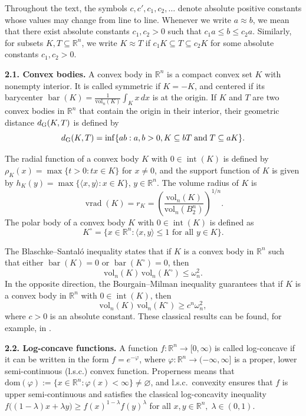\documentclass[11pt,leqno]{article}
\theoremstyle{definition}
\theoremstyle{remark}
\numberwithin{equation}{section}
\newcommand{\vol}{\mathrm{vol}}
\newcommand{\ls}{\leqslant}
\newcommand{\gr}{\geqslant}
\begin{document}
\smallskip

Throughout the text, the symbols $c, c', c_1, c_2, \ldots$ denote absolute positive constants whose values may change from line to line.  
Whenever we write $a \approx b$, we mean that there exist absolute constants $c_1, c_2 > 0$ such that $c_1 a \ls b \ls c_2 a$. 
Similarly, for subsets $K,T\subseteq \mathbb{R}^n$, we write $K\approx T$ if
$c_1K\subseteq T\subseteq c_2K$ for some absolute constants $c_1,c_2>0$.

\bigskip 

\textbf{2.1. Convex bodies.} A convex body in $\mathbb{R}^n$ is a compact convex set $K$ with nonempty interior.  
It is called symmetric if $K = -K$, and centered if its barycenter 
$\operatorname{bar}(K) = \frac{1}{\vol_n(K)} \int_K x\,dx$ is at the origin. If $K$ and $T$ are two convex bodies in ${\mathbb R}^n$ that contain
the origin in their interior, their geometric distance $d_{{\rm G}}(K,T)$ is defined by
$$d_{{\rm G}}(K,T)=\inf\{ ab:a,b>0,K\subseteq bT\;\hbox{and}\;T\subseteq aK\}.$$

The radial function of a convex body $K$ with $0 \in \operatorname{int}(K)$ is defined by
$\rho_K(x) = \max\{ t > 0 : t x \in K \}$ for $x \neq 0$,
and the support function of $K$ is given by $h_K(y) = \max\{ \langle x, y \rangle : x \in K \}$, 
$y \in \mathbb{R}^n$.
The volume radius of $K$ is
$$\operatorname{vrad}(K)= r_K=\left( \frac{\vol_n(K)}{\vol_n(B_2^n)} \right)^{1/n}.$$
The polar body of a convex body $K$ with $0 \in \operatorname{int}(K)$ is defined as
$$K^\circ = \{ x \in \mathbb{R}^n : \langle x, y \rangle \ls 1 \text{ for all } y \in K \}.$$

The Blaschke--Santal\'{o} inequality states that if $K$ is a convex body in $\mathbb{R}^n$ such that either 
$\operatorname{bar}(K) = 0$ or $\operatorname{bar}(K^\circ) = 0$, then
$$\vol_n(K)\,\vol_n(K^\circ) \ls \omega_n^2.$$
In the opposite direction, the Bourgain--Milman inequality guarantees that if $K$ is a convex body in $\mathbb{R}^n$ 
with $0 \in \operatorname{int}(K)$, then
$$\vol_n(K)\,\vol_n(K^\circ)\gr c^n \omega_n^2,$$
where $c>0$ is an absolute constant. These classical results can be found, for example, in \cite{AGA-book}.

\bigskip 

\textbf{2.2. Log-concave functions.} A function $f : \mathbb{R}^n \to [0,\infty)$ is called log-concave if it can be written in the form  
$f = e^{-\varphi}$, where $\varphi : \mathbb{R}^n \to (-\infty,\infty]$ is a proper, lower semi-continuous (l.s.c.) convex
function. Properness means that $\mathrm{dom}(\varphi) := \{x \in \mathbb{R}^n : \varphi(x) < \infty\} \neq \varnothing$,
and l.s.c.\ convexity ensures that $f$ is upper semi-continuous and satisfies the classical log-concavity inequality  
$f\big((1-\lambda)x+\lambda y\big) \gr f(x)^{1-\lambda} f(y)^\lambda$ for all $x,y \in \mathbb{R}^n,\; \lambda \in (0,1)$.
\end{document}

